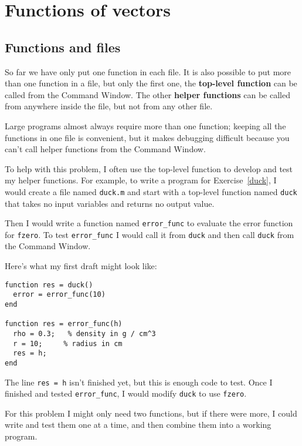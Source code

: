 
\chapter{Functions of vectors}


\section{Functions and files}
\label{funfiles}

So far we have only put one function in each file. It is also
possible to put more than one function in a file, but only the first
one, the {\bf top-level function} can be called from the Command
Window. The other {\bf helper functions} can be called from anywhere
inside the file, but not from any other file.

Large programs almost always require more than one function; keeping
all the functions in one file is convenient, but it makes debugging
difficult because you can't call helper functions from the Command
Window.

To help with this problem, I often use the top-level function
to develop and test my helper functions. For example, to write
a program for Exercise~\ref{duck}, I would create a file named
{\tt duck.m} and start with a top-level function named {\tt duck}
that takes no input variables and returns no output value.

Then I would write a function named {\tt error\_func} to
evaluate the error function for {\tt fzero}. To test
{\tt error\_func} I would call it from {\tt duck} and then
call {\tt duck} from the Command Window.

Here's what my first draft might look like:

\begin{verbatim}
function res = duck()
  error = error_func(10)
end

function res = error_func(h)
  rho = 0.3;   % density in g / cm^3
  r = 10;     % radius in cm
  res = h;
end
\end{verbatim}

The line {\tt res = h} isn't finished yet, but this
is enough code to test.
Once I finished and tested {\tt error\_func}, I would modify
{\tt duck} to use {\tt fzero}.

For this problem I might only need two functions, but if there
were more, I could write and test them one at a time, and then
combine them into a working program.



